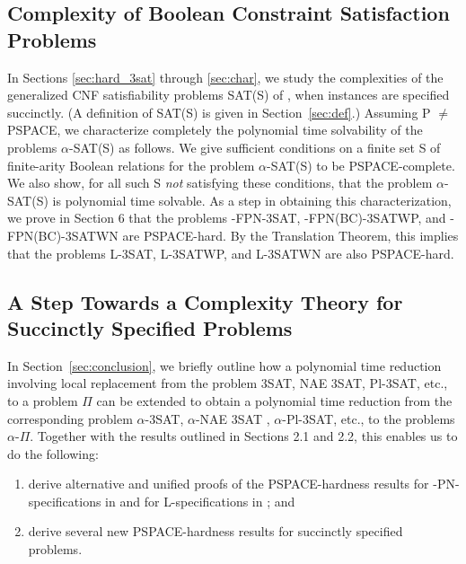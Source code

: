 \subsection{Complexity of Boolean Constraint Satisfaction Problems}\label{sec:sat}

In Sections \ref{sec:hard_3sat} through \ref{sec:char}, we study
the complexities of the generalized {\sf CNF}  satisfiability
problems {\sf SAT(S)} of \cite{Sc78}, when instances are specified
succinctly.  (A definition of {\sf SAT(S)} is given in
Section~\ref{sec:def}.) Assuming {\sf P} $\neq$ {\sf PSPACE}, we
characterize completely the polynomial time solvability of the
problems  $\alpha$-{\sf SAT(S)} as follows. We give sufficient
conditions on a finite set {\sf S} of finite-arity Boolean relations
for the problem  $\alpha$-{\sf SAT(S)} to be {\sf PSPACE-}complete.
We also show, for all such {\sf S} {\em not} satisfying these
conditions, that the problem $\alpha$-{\sf SAT(S)} is polynomial
time solvable. 
As a step in obtaining this characterization,
we prove in Section 6 
that the problems {-FPN-3SAT}, {-FPN(BC)-3SATWP},
and {-FPN(BC)-3SATWN} are {\sf PSPACE-}hard. By the Translation
Theorem, this implies that the problems {\sf L-3SAT}, {\sf L-3SATWP},
and {\sf L-3SATWN} are also {\sf PSPACE-}hard.

\subsection{A Step Towards a Complexity Theory for Succinctly Specified 
Problems}
In Section~\ref{sec:conclusion}, we briefly outline how a 
polynomial time reduction involving
local replacement \cite{GJ79} from the problem 
{\sf 3SAT, NAE 3SAT, Pl-3SAT,} etc., to a problem $\Pi$ can be extended
to obtain a polynomial time reduction from the corresponding problem 
$\alpha$-{\sf 3SAT}, $\alpha$-{\sf NAE 3SAT} ,
 $\alpha$-{\sf Pl-3SAT}, etc., to the problems
 $\alpha$-$\Pi$. Together with the results outlined in 
Sections 2.1 and 2.2, this enables us to do the following:
\begin{enumerate}
\item derive alternative and unified proofs of the {\sf PSPACE-}hardness 
results for {-PN-} specifications in \cite{Or82a} and for
 {\sf L-}specifications in \cite{LW92}; and 
\item derive several new {\sf PSPACE-}hardness results for succinctly 
specified problems. 
\end{enumerate}

